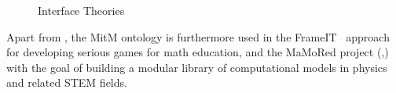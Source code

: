 \begin{figure}[ht]%
	\centering
  \vspace*{-.5em}
  \caption{Interface Theories}\label{fig:interface-theories}\vspace*{-1em}
\end{figure}


Apart from \ODK, the MitM ontology is furthermore used in the FrameIT~\cite{RocKohMue:frsmgmmo16} approach
for developing serious games for math education, and the MaMoRed project (\cite{KohKopMue:mmrdftg17},\cite{KopKohTab:mpdrmm18}) with the goal of building a modular library of computational models in physics and related STEM fields.




